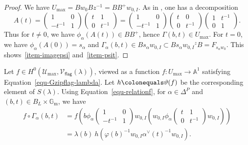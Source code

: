 \documentclass[11pt]{amsart}
\numberwithin{equation}{section}
\theoremstyle{definition}
\theoremstyle{remark}
\newcommand{\flag}{\mathsf{flag}}
\newcommand{\Ucal}{{\mathcal U}}
\newcommand{\Vcal}{{\mathcal V}}
\renewcommand{\AA}{\mathbb{A}}
\newcommand{\GG}{\mathbb{G}}
\begin{document}
\begin{proof}
We have $U_{\max}=Bw_0Bz^{-1}=BB^+ w_{0,I}$. As in \cite[Equation~(3.1.3)]{Imai-Koskivirta-vector-bundles}, one has a decomposition
\begin{equation} \label{At}
A(t)=\left(\begin{matrix}
1&0\\-t^{-1}&1
\end{matrix} \right) \left(\begin{matrix}
t&1\\0&t^{-1}
\end{matrix} \right)=\left(\begin{matrix}
1&0\\-t^{-1}&1
\end{matrix} \right) \left(\begin{matrix}
t&0\\0&t^{-1}
\end{matrix} \right)\left(\begin{matrix}
1&t^{-1}\\0&1
\end{matrix} \right).
\end{equation}
Thus for $t\neq 0$, we have $\phi_\alpha(A(t))\in BB^+$, hence $\Gamma(b,t)\in U_{\max}$. For $t=0$, we have $\phi_{\alpha} (A(0))=s_\alpha$ and $\Gamma_{\alpha}(b,t)\in B s_{\alpha}w_{0,I} \subset B s_{\alpha}w_{0,I} {}^z B =F_{s_\alpha w_0}$. This shows~\eqref{item-imagepsi} and~\eqref{item-psit}.
\end{proof}

Let $f\in H^0(\Ucal_{\max},\Vcal_{\flag}(\lambda))$, viewed as a function $f\colon U_{\max}\to \AA^1$ satisfying Equation~\eqref{equ-Gzipflag-lambda}. Let $h \colonequals \vartheta(f)$ be the corresponding element of $S(\lambda)$. Using Equation~\eqref{equ-relationf},  for $\alpha \in \Delta^P$ and $(b,t)\in B_L\times \GG_{\mathrm{m}}$, we have 
\begin{align}
f\circ \Gamma_\alpha(b,t)&= f\left(b \phi_{\alpha}\left(\begin{matrix}
1&0\\-t^{-1}&1\end{matrix} \right)w_{0,I} \left(w_{0,I} \phi_{\alpha}\left(\begin{matrix}
t&1\\0&t^{-1}\end{matrix} \right)w_{0,I} \right)\right)\\
&= \lambda(b) \ h\left(\varphi (b)^{-1} 
w_{0,I} \alpha^{\vee}(t)^{-1} w_{0,I}\right).
\end{align}
\end{document}
